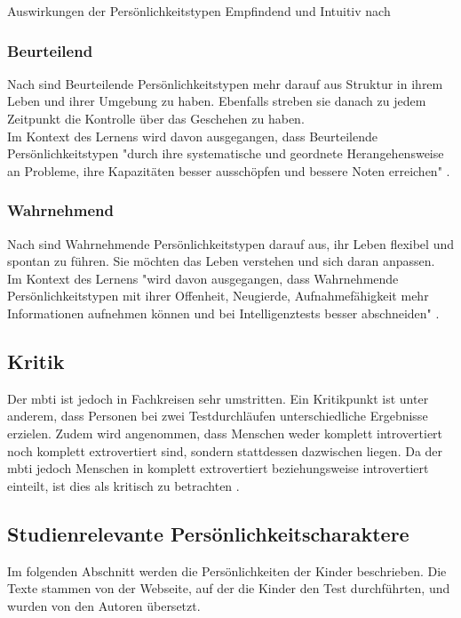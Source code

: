 \begin{table}[H]
	\caption[Auswirkungen der Persönlichkeitstypen Empfindend und Intuitiv]{Auswirkungen der Persönlichkeitstypen Empfindend und Intuitiv nach \citeauthor{mccaulley_myers-briggs_1974} \cite[6]{mccaulley_myers-briggs_1974}}
	\label{tab:intsens}
\end{table}

\subsubsection{Beurteilend}
Nach \citeauthor{mccaulley_myers-briggs_1974} sind Beurteilende Persönlichkeitstypen mehr darauf aus Struktur in ihrem Leben und ihrer Umgebung zu haben. Ebenfalls streben sie danach zu jedem Zeitpunkt die Kontrolle über das Geschehen zu haben. \\
Im Kontext des Lernens wird davon ausgegangen, dass Beurteilende Persönlichkeitstypen "durch ihre systematische und geordnete Herangehensweise an Probleme, ihre Kapazitäten besser ausschöpfen und bessere Noten erreichen" \cite{mccaulley_myers-briggs_1974}.

\subsubsection{Wahrnehmend}
Nach \citeauthor{mccaulley_myers-briggs_1974} sind Wahrnehmende Persönlichkeitstypen darauf aus, ihr Leben flexibel und spontan zu führen. Sie möchten das Leben verstehen und sich daran anpassen.\\
Im Kontext des Lernens "wird davon ausgegangen, dass Wahrnehmende Persönlichkeitstypen mit ihrer Offenheit, Neugierde, Aufnahmefähigkeit mehr Informationen aufnehmen können und bei Intelligenztests besser abschneiden" \cite{mccaulley_myers-briggs_1974}.

\subsection{Kritik}
Der \acrshort{mbti} ist jedoch in Fachkreisen sehr umstritten. Ein Kritikpunkt ist unter anderem, dass Personen bei zwei Testdurchläufen unterschiedliche Ergebnisse erzielen. Zudem wird angenommen, dass Menschen weder komplett introvertiert noch komplett extrovertiert sind, sondern stattdessen dazwischen liegen. Da der \acrshort{mbti} jedoch Menschen in komplett extrovertiert beziehungsweise introvertiert einteilt, ist dies als kritisch zu betrachten \cite{pittengerDavid2005}. 


\subsection{Studienrelevante Persönlichkeitscharaktere}
Im folgenden Abschnitt werden die Persönlichkeiten der Kinder beschrieben. Die Texte stammen von der Webseite, auf der die Kinder den Test durchführten, und wurden von den Autoren übersetzt.

